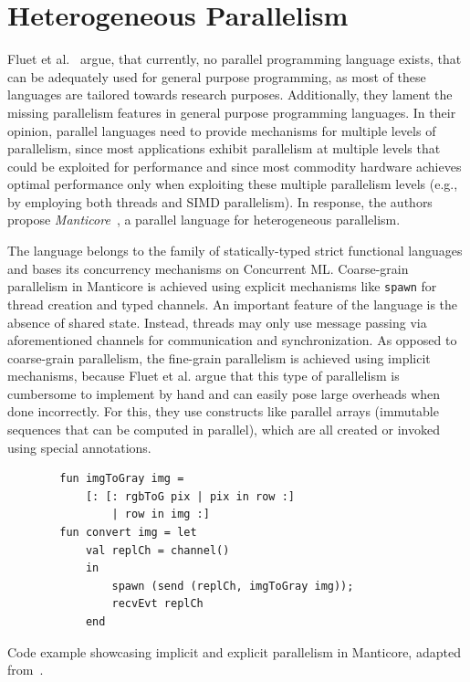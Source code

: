 \section{Heterogeneous Parallelism}
\label{sec:related:manticore}
Fluet et al.~\cite{fluet2007manticore} argue, that currently, no parallel programming language exists, that can be adequately used for general purpose programming, as most of these languages are tailored towards research purposes.
Additionally, they lament the missing parallelism features in general purpose programming languages.
In their opinion, parallel languages need to provide mechanisms for multiple levels of parallelism, since most applications exhibit parallelism at multiple levels that could be exploited for performance and since most commodity hardware achieves optimal performance only when exploiting these multiple parallelism levels (e.g., by employing both threads and SIMD parallelism).
In response, the authors propose \emph{Manticore}~\cite{fluet2007manticore, fluet2007status, fluet2009programming, fluet2010implicitly}, a parallel language for heterogeneous parallelism.

The language belongs to the family of statically-typed strict functional languages and bases its concurrency mechanisms on Concurrent ML.
Coarse-grain parallelism in Manticore is achieved using explicit mechanisms like \texttt{spawn} for thread creation and typed channels.
An important feature of the language is the absence of shared state.
Instead, threads may only use message passing via aforementioned channels for communication and synchronization.
As opposed to coarse-grain parallelism, the fine-grain parallelism is achieved using implicit mechanisms, because Fluet et al. argue that this type of parallelism is cumbersome to implement by hand and can easily pose large overheads when done incorrectly.
For this, they use constructs like parallel arrays (immutable sequences that can be computed in parallel), which are all created or invoked using special annotations.

\begin{listing}[h]
    \begin{verbatim}
        fun imgToGray img =
            [: [: rgbToG pix | pix in row :]
                | row in img :]
        fun convert img = let
            val replCh = channel()
            in
                spawn (send (replCh, imgToGray img));
                recvEvt replCh
            end
    \end{verbatim}
    \caption{Code example showcasing implicit and explicit parallelism in Manticore, adapted from~\cite{fluet2007manticore}.}%
    \label{fig:related:manticore}
\end{listing}

